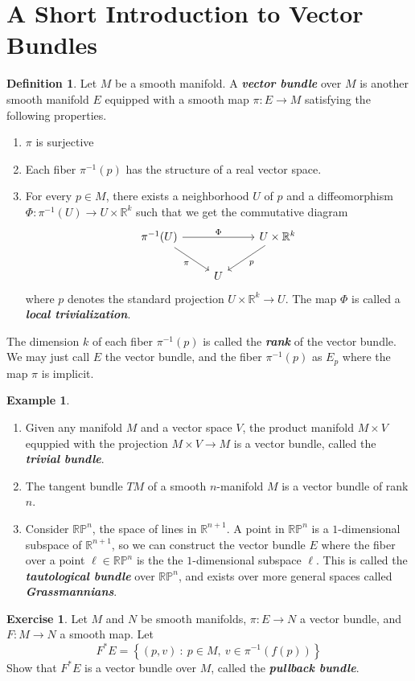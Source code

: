 \documentclass[psamsfonts]{amsart}
\theoremstyle{definition}
\newtheorem{defn}[thm]{Definition}
\newtheorem{exmp}[thm]{Example}
\newtheorem{exer}[thm]{Exercise}
\theoremstyle{remark}
\newcommand{\R}{\mathbb{R}}
\newcommand{\ib}[1]{\textbf{\textit{#1}}}
\newcommand{\RP}{\mathbb{RP}}
\newcommand{\inv}{^{-1}}
\newcommand{\set}[1]{\left\lbrace #1 \right\rbrace}
\newcommand{\enumbreak}{\ \\ \vspace{-\baselineskip}}
\begin{document}
\section{A Short Introduction to Vector Bundles}
%
\begin{defn}
Let $M$ be a smooth manifold. A \ib{vector bundle} over $M$ is
another smooth manifold $E$ equipped with a smooth map $\pi : E \to M$
satisfying the following properties.
\begin{enumerate}
	\item $\pi$ is surjective
	\item Each fiber $\pi\inv(p)$ has the structure of a real vector space.
	\item For every $p \in M$, there exists a neighborhood $U$ of $p$ and
	a diffeomorphism $\Phi : \pi\inv(U) \to U \times \R^k$ such that we get
	the commutative diagram
	$$\begin{tikzcd}
	\pi\inv(U) \ar[dr, "\pi"'] \ar[rr, "\Phi"] &&
	U \times \R^k \ar[dl, "p"] \\
	& U
	\end{tikzcd}$$
	where $p$ denotes the standard projection $U \times \R^k \to U$. The
	map $\Phi$ is called a \ib{local trivialization}.
\end{enumerate}
The dimension $k$ of each fiber $\pi\inv(p)$ is called the \ib{rank} of
the vector bundle. We may just call $E$ the vector bundle, and the fiber
$\pi\inv(p)$ as $E_p$ where the map $\pi$ is implicit.
\end{defn}
%
\begin{exmp} \enumbreak
	\begin{enumerate}
		\item Given any manifold $M$ and a vector space $V$, the product
		manifold $M \times V$ equppied with the projection $M \times V \to M$
		is a vector bundle, called the \ib{trivial bundle}.
		\item The tangent bundle $TM$ of a smooth $n$-manifold $M$ is a
		vector bundle of rank $n$.
		\item Consider $\RP^n$, the space of lines in $\R^{n+1}$. A point
		in $\RP^n$ is a $1$-dimensional subspace of $\R^{n+1}$, so we can
		construct the vector bundle $E$ where the fiber over a point
		$\ell \in \RP^n$ is the the $1$-dimensional subspace $\ell$.
		This is called the \ib{tautological bundle} over $\RP^n$, and
		exists over more general spaces called \ib{Grassmannians}.
	\end{enumerate}
\end{exmp}
%
\begin{exer}
	Let $M$ and $N$ be smooth manifolds, $\pi : E \to N$ a vector bundle,
	and $F : M \to N$ a smooth map. Let
	$$F^*E = \set{(p, v) ~:~ p \in M, ~v \in \pi\inv(f(p))} $$
	Show that $F^*E$ is a vector bundle over $M$, called the
	\ib{pullback bundle}.
\end{exer}
\end{document}
